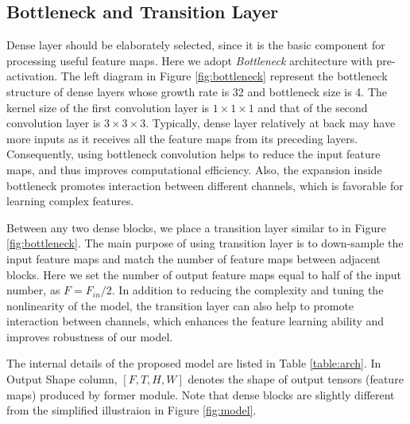 \documentclass[10pt,twocolumn,letterpaper]{article}
\begin{document}

\subsection{Bottleneck and Transition Layer}

Dense layer should be elaborately selected, since it is the basic component for processing useful feature maps. 
Here we adopt \emph{Bottleneck} architecture with pre-activation. 
The left diagram in Figure \ref{fig:bottleneck} represent the bottleneck structure of dense layers whose growth rate is 32 and bottleneck size is 4.
The kernel size of the first convolution layer is $1 \times 1 \times 1$ and that of the second convolution layer is $3 \times 3 \times 3$.
Typically, dense layer relatively at back may have more inputs as it receives all the feature maps from its preceding layers. 
Consequently, using bottleneck convolution helps to reduce the input feature maps, and thus improves computational efficiency.
Also, the expansion inside bottleneck promotes interaction between different channels, which is favorable for learning complex features.

Between any two dense blocks, we place a transition layer similar to \cite{densenet} in Figure \ref{fig:bottleneck}.
The main purpose of using transition layer is to down-sample the input feature maps and match the number of feature maps between adjacent blocks.
Here we set the number of output feature maps equal to half of the input number, as $F = F_{in}/2$. 
In addition to reducing the complexity and tuning the nonlinearity of the model, the transition layer can also help to promote interaction between channels, which enhances the feature learning ability and improves robustness of our model.

The internal details of the proposed model are listed in Table \ref{table:arch}. 
In Output Shape column, $[F, T, H, W]$ denotes the shape of output tensors (feature maps) produced by former module.
Note that dense blocks are slightly different from the simplified illustraion in Figure \ref{fig:model}. 
\end{document}
